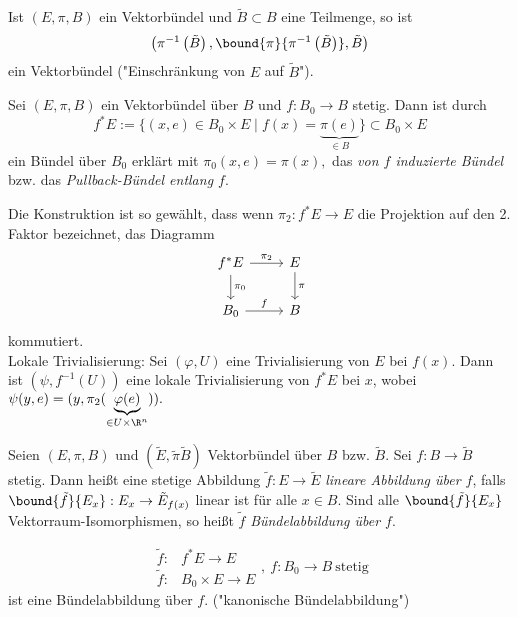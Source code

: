 \begin{defn}[Einschränkungen]
	Ist $ (E,\pi,B) $ ein Vektorbündel und $\tilde{B} \subset B$ eine Teilmenge, so ist
	\[ \left( \pi^{-1} \left( \tilde{B} \right), \bound{\pi}{\pi^{-1} \left( \tilde{B} \right)}, \tilde{B} \right) \]
	ein Vektorbündel ("Einschränkung von $E$ auf $\tilde{B}$").
\end{defn}

\begin{defn}
	Sei $ (E ,\pi,B) $ ein Vektorbündel über $B$ und $f: B_0 \to B$ stetig. Dann ist durch
	\[ f^*E := \{(x,e) \in B_0 \times E \mid f(x) = \underbrace{\pi(e)}_{\in B}\} \subset B_0 \times E \]
	ein Bündel über $B_0$ erklärt mit $ \pi_0(x,e) = \pi(x), $ das \emph{von $f$ induzierte Bündel} bzw. das \emph{Pullback-Bündel entlang $f$}.
\end{defn}

\begin{rem}
	Die Konstruktion ist so gewählt, dass wenn $\pi_2: f^*E \to E$ die Projektion auf den 2. Faktor bezeichnet, das Diagramm
	\[ \begin{tikzcd}
		f^*E \arrow{r}{\pi_2} \arrow{d}{\pi_0} & E \arrow{d}{\pi}\\
		B_0 \arrow{r}{f} & B
	\end{tikzcd} \]
	kommutiert.\\
	Lokale Trivialisierung: Sei $ (\varphi,U) $ eine Trivialisierung von $E$ bei $f(x)$. Dann ist $ (\psi,f^{-1}(U)) $ eine lokale Trivialisierung von $f^*E$ bei $x$, wobei $ \psi(y,e) = (y,\pi_2(\underbrace{\varphi(e)}_{\in U \times \R^n})). $
\end{rem}

\begin{defn}
	Seien $ (E,\pi,B) $ und $ (\tilde{E},\tilde{\pi}\tilde{B}) $ Vektorbündel über $B$ bzw. $\tilde{B}$. Sei $f: B \to \tilde{B}$ stetig. Dann heißt eine stetige Abbildung $\tilde{f}: E \to \tilde{E}$ \emph{lineare Abbildung über $f$}, falls $ \bound{\tilde{f}}{E_x}: E_x \to \tilde{E}_{f(x)} $ linear ist für alle $x \in B$. Sind alle $ \bound{\tilde{f}}{E_x} $ Vektorraum-Isomorphismen, so heißt $\tilde{f}$ \emph{Bündelabbildung über $f$}.
\end{defn}
	
\begin{exmp*}
	\[ \begin{aligned}
		\tilde{f}:& f^*E \to E\\
		\tilde{f}:& B_0 \times E \to E
	\end{aligned},\ f:B_0 \to B \ \text{stetig} \]
	ist eine Bündelabbildung über $f$. ("kanonische Bündelabbildung")
\end{exmp*}

